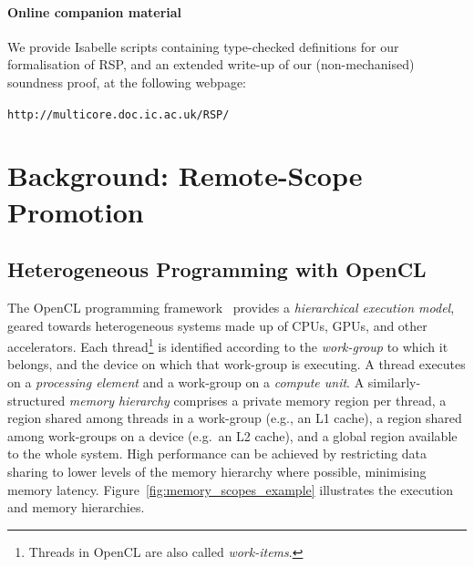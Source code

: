 \documentclass[svgnames,10pt]{sigplanconf}
\theoremstyle{definition}
\begin{document}
\paragraph{Online companion material}  We provide Isabelle scripts
containing type-checked definitions for our formalisation of RSP, and
an extended write-up of our (non-mechanised) soundness proof, 
at the following webpage: 
\begin{center}
\texttt{http://multicore.doc.ic.ac.uk/RSP/}
\end{center}

\section{Background: Remote-Scope Promotion}

\subsection{Heterogeneous Programming with OpenCL} 

The OpenCL programming framework~\cite{munshi13} provides a
\emph{hierarchical execution model}, geared towards heterogeneous
systems made up of CPUs, GPUs, and other accelerators. Each
thread\footnote{Threads in OpenCL are also called \emph{work-items}.}
is identified according to the \emph{work-group} to which it belongs,
and the device on which that work-group is executing. A thread
executes on a \emph{processing element} and a work-group on a
\emph{compute unit}.  A similarly-structured \emph{memory hierarchy}
comprises a private memory region per thread, a region shared among
threads in a work-group (e.g., an L1 cache), a region shared among
work-groups on a device (e.g.~an L2 cache), and a global region
available to the whole system. High performance can be achieved by
restricting data sharing to lower levels of the memory hierarchy where
possible, minimising memory
latency. Figure~\ref{fig:memory_scopes_example} illustrates the
execution and memory hierarchies.
\end{document}
